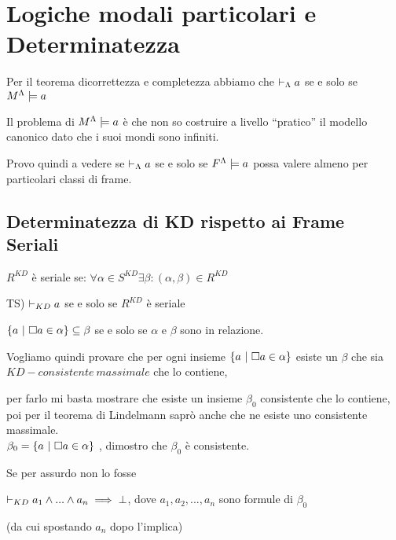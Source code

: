 
\chapter{Logiche modali particolari e Determinatezza}

Per il teorema dicorrettezza e completezza abbiamo che $\vdash_{\Lambda}a$
se e solo se $M^{\Lambda}\models a$

Il problema di $M^{\Lambda}\models a$ è che non so costruire a livello
``pratico'' il modello canonico dato che i suoi mondi sono infiniti.

Provo quindi a vedere se $\vdash_{\Lambda}a$ se e solo se $F^{\Lambda}\models a$
possa valere almeno per particolari classi di frame.



\section{Determinatezza di KD rispetto ai Frame Seriali}

$R^{KD}$ è seriale se: $\forall\alpha\in S^{KD}\exists\beta:(\alpha,\beta)\in R^{KD}$

TS) $\vdash_{KD}a$ se e solo se $R^{KD}$ è seriale



$\{a\ |\ \square a\in\alpha\}\subseteq\beta$ se e solo se $\alpha$ e $\beta$ sono
in relazione.

Vogliamo quindi provare che per ogni insieme $\{a\ |\ \square a\in\alpha\}$
esiste un $\beta$ che sia $KD-consistente\ massimale$ che lo contiene,

per farlo mi basta mostrare che esiste un insieme $\beta_{0}$ consistente
che lo contiene, poi per il teorema di Lindelmann saprò anche che
ne esiste uno consistente massimale.\\


$\beta_{0}=\{a\ |\ \square a\in\alpha\}$ , dimostro che $\beta_{0}$ è
consistente.

Se per assurdo non lo fosse

$\vdash_{KD}a_{1}\wedge...\wedge a_{n}\implies\bot$, dove $a_{1},a_{2},...,a_{n}$
sono formule di $\beta_{0}$

(da cui spostando $a_{n}$ dopo l'implica)

